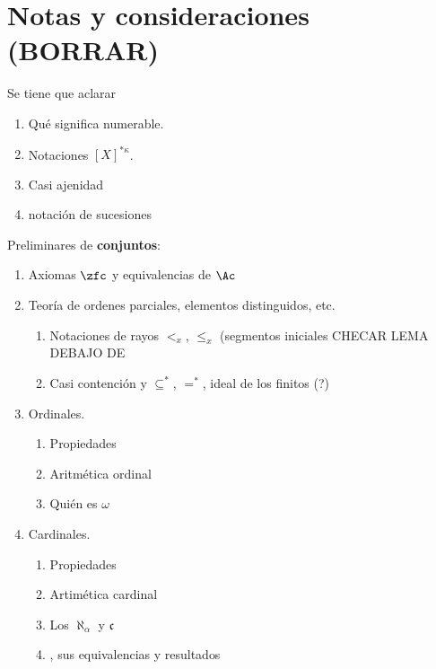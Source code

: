 \chapter*{Notas y consideraciones (BORRAR)}

\begin{flushright}
	Se tiene que aclarar
\end{flushright}

\begin{enumerate}
	\item Qué significa numerable.
	\item Notaciones $[X]^{* \kappa}$.
	\item Casi ajenidad
	\item notación de sucesiones
\end{enumerate}

\begin{flushright}
	Preliminares de \textbf{conjuntos}:
\end{flushright}
\begin{enumerate}
	\item Axiomas $\zfc$ y equivalencias de $\Ac$
	\item Teoría de ordenes parciales, elementos distinguidos, etc.
	      \begin{enumerate}
		      \item Notaciones de rayos $<_x$, $\leq_x$ (segmentos iniciales CHECAR LEMA DEBAJO DE
		      \item Casi contención y $\subseteq^*$, $=^*$, ideal de los finitos (?)
	      \end{enumerate}
	\item Ordinales.
	      \begin{enumerate}
		      \item Propiedades
		      \item Aritmética ordinal
		      \item Quién es $\omega$
	      \end{enumerate}
	\item Cardinales.
	      \begin{enumerate}
		      \item Propiedades
		      \item Artimética cardinal
		      \item Los $\aleph_\alpha$ y $\mathfrak{c}$
		      \item \HC, sus equivalencias y resultados
	      \end{enumerate}
\end{enumerate}

